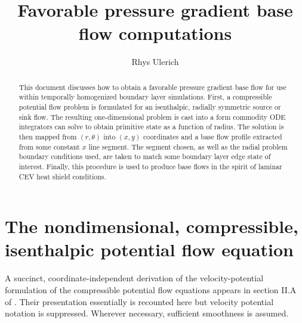 \documentclass[letterpaper,11pt,nointlimits,reqno]{amsart}
\begin{document}
\title{Favorable pressure gradient base flow computations}
\author{Rhys Ulerich}

\begin{abstract}
This document discusses how to obtain a favorable pressure gradient base flow
for use within temporally homogenized boundary layer simulations.  First, a
compressible potential flow problem is formulated for an isenthalpic, radially
symmetric source or sink flow.  The resulting one-dimensional problem is cast
into a form commodity ODE integrators can solve to obtain primitive state as a
function of radius.  The solution is then mapped from $\left(r,\theta\right)$
into $\left(x,y\right)$ coordinates and a base flow profile extracted from some
constant $x$ line segment.  The segment chosen, as well as the radial problem
boundary conditions used, are taken to match some boundary layer edge state of
interest.  Finally, this procedure is used to produce base flows in the spirit
of laminar CEV heat shield conditions.
\end{abstract}

\maketitle

\tableofcontents

\section{The nondimensional, compressible, isenthalpic potential flow equation}

A succinct, coordinate-independent derivation of the velocity-potential
formulation of the compressible potential flow equations appears in section
II.A of \citet{Saad2011Coordinate}.  Their presentation essentially is
recounted here but velocity potential notation is suppressed.  Wherever
necessary, sufficient smoothness is assumed.
\end{document}
